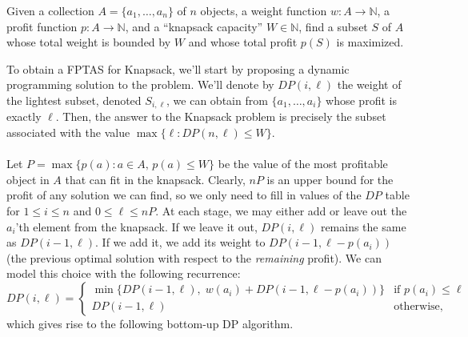 \documentclass{article}
\newcommand{\N}{\mathbb{N}}
\newenvironment{envsection}[1]{\begin{trivlist}
\item[\hskip \labelsep {\bfseries #1}]}{\end{trivlist}}
\begin{document}
\begin{envsection}{Optimization Problem (Knapsack).}
    Given a collection $A = \{a_1,\dots,a_n\}$ of $n$ objects, a weight function $w: A \to \N$, a profit function $p: A \to \N$, and a ``knapsack capacity'' $W \in \N$, find a subset $S$ of $A$ whose total weight is bounded by $W$ and whose total profit $p(S)$ is maximized.
\end{envsection}

\noindent To obtain a FPTAS for Knapsack, we'll start by proposing a dynamic programming solution to the problem. We'll denote by $DP(i,\ell)$ the weight of the lightest subset, denoted $S_{i,\ell}$, we can obtain from $\{a_1,\dots,a_i\}$ whose profit is exactly $\ell$. Then, the answer to the Knapsack problem is precisely the subset associated with the value $\max \{\ell : DP(n,\ell) \leq W\}$.\\
\\
Let $P = \max \{p(a): a \in A,\, p(a) \leq W\}$ be the value of the most profitable object in $A$ that can fit in the knapsack. Clearly, $nP$ is an upper bound for the profit of any solution we can find, so we only need to fill in values of the $DP$ table for $1 \leq i \leq n$ and $0 \leq \ell \leq nP$. At each stage, we may either add or leave out the $a_i$'th element from the knapsack. If we leave it out, $DP(i,\ell)$ remains the same as $DP(i-1,\ell)$. If we add it, we add its weight to $DP(i-1,\ell-p(a_i))$ (the previous optimal solution with respect to the \textit{remaining} profit). We can model this choice with the following recurrence:
\[
DP(i, \ell) = 
\begin{cases}
    \min \{DP(i-1,\ell),\; w(a_i) + DP(i-1, \ell - p(a_{i}))\} &\text{if $p(a_{i}) \leq \ell$}\\
    DP(i-1,\ell) &\text{otherwise,}
\end{cases}
\]
which gives rise to the following bottom-up DP algorithm.
\end{document}
